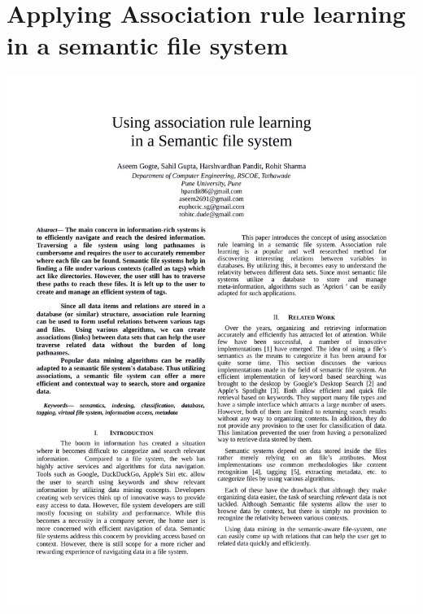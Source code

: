 \section{Applying Association rule learning in a semantic file system}
\hspace*{-1.5cm}
\includegraphics[page=1,scale=0.75]{./appendix/sem2.pdf}
	

